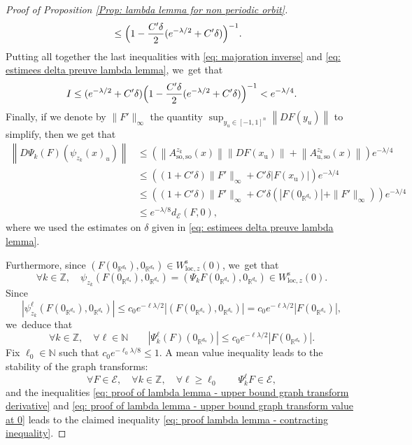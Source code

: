 \documentclass[11pt]{article}
\newcommand{\loc}{\mathrm{loc}}
\newcommand{\rs}{\mathrm{s}}
\newcommand{\rso}{\mathrm{so}}
\newcommand{\ru}{\mathrm{u}}
\theoremstyle{definition}
\theoremstyle{plain}
\newcommand{\Ecal}{\mathcal{E}}
\newcommand{\N}{\mathbb{N}}
\newcommand{\R}{\mathbb{R}}
\newcommand{\Z}{\mathbb{Z}}
\begin{document}
\begin{appendix}
\begin{proof}[Proof of Proposition \ref{Prop: lambda lemma for non periodic orbit}]
\begin{align*}
&\leq \Bigl(1 - \frac{C' \delta}{2} (e^{- \lambda/2 } + C' \delta) \Bigr)^{-1}.
\end{align*}
Putting all together the last inequalities with \eqref{eq: majoration inverse} and \eqref{eq: estimees delta preuve lambda lemma}, we~get that
\[
I \leq (e^{-\lambda/ 2} + C' \delta) \Bigl(1 - \frac{C' \delta}{2} (e^{- \lambda/ 2} + C' \delta) \Bigr)^{-1} < e^{- \lambda / 4}.
\]
Finally, if we denote by $\|F'\|_{\infty}$ the quantity $\sup_{y_u \in [-1,1]^n}\left\| DF (y_u) \right\|$ to simplify, then we get that
\begin{equation}\label{eq: proof of lambda lemma - upper bound graph transform derivative}
\begin{split}
\left\| D \Psi_k (F) \left(\psi_{z_k} (x)_u \right) \right\| &\leq \left(\left\| A_{\rso,\rso}^{z_k} (x)\right\| \left\| DF (x_\ru) \right\| + \left\| A_{\ru,\rso}^{z_k} (x) \right\| \right) e^{- \lambda/4}\\
&\leq \left((1 + C' \delta) \|F'\|_{\infty} + C' \delta |F(x_\ru)| \right)e^{- \lambda/4} \\
&\leq \left((1 + C' \delta) \|F'\|_{\infty} + C' \delta \left(|F(0_{\R^{d_\ru}})| + \|F'\|_{\infty} \right) \right) e^{- \lambda / 4}
\\
&\leq e^{- \lambda /8} d_{\Ecal}(F, 0),
\end{split}
\end{equation}
where we used the estimates on $\delta$ given in \eqref{eq: estimees delta preuve lambda lemma}.

Furthermore, since $(F(0_{\R^{d_\ru}}), 0_{\R^{d_\ru}}) \in W_{\loc,z}^\rs (0)$, we~get that
\[
\forall k \in \Z, \quad \psi_{z_k} (F(0_{\R^{d_\ru}}), 0_{\R^{d_\ru}}) = (\Psi_k F (0_{\R^{d_\ru}}), 0_{\R^{d_\ru}}) \in W_{\loc,z}^\rs (0).
\]
Since
\[
| \psi_{z_k}^{\ell} (F(0_{\R^{d_\ru}}), 0_{\R^{d_\ru}})| \leq c_0 e^{- \ell \lambda / 2} | (F(0_{\R^{d_\ru}}), 0_{\R^{d_\ru}})| = c_0 e^{- \ell \lambda / 2} |F(0_{\R^{d_\ru}})|,
\]
we~deduce that
\begin{equation}\label{eq: proof of lambda lemma - upper bound graph transform value at 0}
\forall k \in \Z, \quad \forall \ell \in \N \qquad |\Psi_k^{\ell} (F) (0_{\R^{d_\ru}})| \leq c_0 e^{- \ell\lambda / 2} |F(0_{\R^{d_\ru}})|.
\end{equation}
Fix $\ell_0 \in \N$ such that $c_0 e^{-\ell_0 \lambda /8} \leq 1$. A mean value inequality leads to the stability of the graph transforms:
\begin{equation}\label{eq: proof of lambda lemma - stability of the graph transforms}
\forall F \in \Ecal, \quad \forall k \in \Z, \quad \forall \ell \geq \ell_0 \qquad \Psi_k^{\ell} F \in \Ecal,
\end{equation}
and the inequalities \eqref{eq: proof of lambda lemma - upper bound graph transform derivative} and \eqref{eq: proof of lambda lemma - upper bound graph transform value at 0} leads to the claimed inequality \eqref{eq: proof lambda lemma - contracting inequality}.


\end{proof}
\end{appendix}
\end{document}
